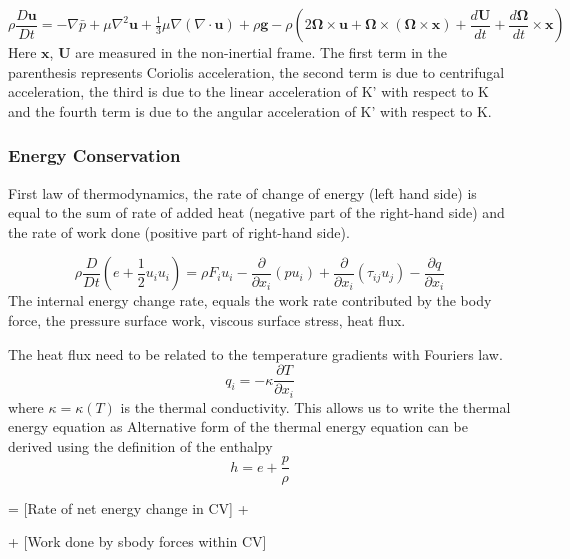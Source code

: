 \documentclass{article}
\begin{document}
\begin{equation}
\rho {\frac {D\mathbf {u} }{Dt}}=-\nabla \bar{p} +\mu \nabla^{2}\mathbf{u} +{\tfrac {1}{3}}\mu \nabla (\nabla \cdot \mathbf{u} )+\rho \mathbf{g} -\rho \left(2\mathbf{\Omega } \times \mathbf{u} +\mathbf{\Omega } \times (\mathbf{\Omega } \times \mathbf{x} )+{\frac {d\mathbf{U} }{dt}}+{\frac {d\mathbf{\Omega } }{dt}}\times \mathbf{x} \right)
\end{equation}
Here $\mathbf {x}$, $\mathbf {U}$ are measured in the non-inertial frame. The first term in the parenthesis represents Coriolis acceleration, the second term is due to centrifugal acceleration, the third is due to the linear acceleration of K' with respect to K and the fourth term is due to the angular acceleration of K' with respect to K.


\subsubsection{Energy Conservation}

First law of thermodynamics, the rate of change of energy (left hand side) is equal to the sum of rate of added heat (negative part of the right-hand side) and the rate of work done (positive part of right-hand side).

\begin{equation}
\rho \frac{D}{Dt}\left(e + \frac{1}{2}u_i u_i\right) = \rho F_i u_i - \frac{\partial}{\partial x_i}(pu_i)+\frac{\partial}{\partial x_i}(\tau_{ij}u_j) - \frac{\partial q}{\partial x_i}
\end{equation}
The internal energy change rate, equals the work rate contributed by the body force, the pressure surface work, viscous surface stress, heat flux.

The heat flux need to be related to the temperature gradients with Fouriers law.
\begin{equation}
q_i = -\kappa \frac{\partial T}{\partial x_i}
\end{equation}
where $\kappa = \kappa(T)$ is the thermal conductivity. This allows us to write the thermal energy equation as
Alternative form of the thermal energy equation can be derived using the definition of the enthalpy
\begin{equation}
h = e + \frac{p}{\rho}
\end{equation}

 =  [Rate of net energy change in CV] + 

 + [Work done by sbody forces within CV]
\end{document}
